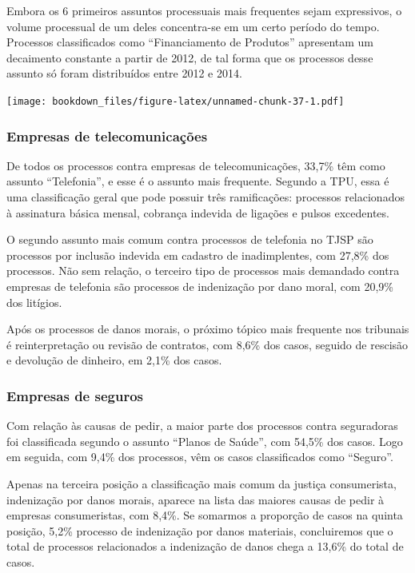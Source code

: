 \documentclass[]{report}
\begin{document}
Embora os 6 primeiros assuntos processuais mais frequentes sejam
expressivos, o volume processual de um deles concentra-se em um certo
período do tempo. Processos classificados como ``Financiamento de
Produtos'' apresentam um decaimento constante a partir de 2012, de tal
forma que os processos desse assunto só foram distribuídos entre 2012 e
2014.

\texttt{[image: bookdown\_files/figure-latex/unnamed-chunk-37-1.pdf]}

\subsubsection{Empresas de
telecomunicações}\label{empresas-de-telecomunicacoes-1}

De todos os processos contra empresas de telecomunicações, 33,7\% têm
como assunto ``Telefonia'', e esse é o assunto mais frequente. Segundo a
TPU, essa é uma classificação geral que pode possuir três ramificações:
processos relacionados à assinatura básica mensal, cobrança indevida de
ligações e pulsos excedentes.

O segundo assunto mais comum contra processos de telefonia no TJSP são
processos por inclusão indevida em cadastro de inadimplentes, com 27,8\%
dos processos. Não sem relação, o terceiro tipo de processos mais
demandado contra empresas de telefonia são processos de indenização por
dano moral, com 20,9\% dos litígios.

Após os processos de danos morais, o próximo tópico mais frequente nos
tribunais é reinterpretação ou revisão de contratos, com 8,6\% dos
casos, seguido de rescisão e devolução de dinheiro, em 2,1\% dos casos.

\subsubsection{Empresas de seguros}\label{empresas-de-seguros}

Com relação às causas de pedir, a maior parte dos processos contra
seguradoras foi classificada segundo o assunto ``Planos de Saúde'', com
54,5\% dos casos. Logo em seguida, com 9,4\% dos processos, vêm os casos
classificados como ``Seguro''.

Apenas na terceira posição a classificação mais comum da justiça
consumerista, indenização por danos morais, aparece na lista das maiores
causas de pedir à empresas consumeristas, com 8,4\%. Se somarmos a
proporção de casos na quinta posição, 5,2\% processo de indenização por
danos materiais, concluiremos que o total de processos relacionados a
indenização de danos chega a 13,6\% do total de casos.
\end{document}
